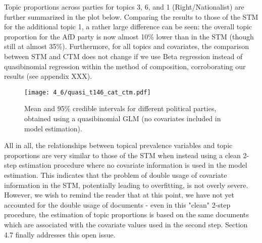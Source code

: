 \documentclass[12pt]{article}
\begin{document}
Topic proportions across parties for topics 3, 6, and 1 (Right/Nationalist) are further summarized in the plot below. Comparing the results to those of the STM for the additional topic 1, a rather large difference can be seen: the overall topic proportion for the AfD party is now almost 10\% lower than in the STM (though still at almost 35\%). Furthermore, for all topics and covariates, the comparison between STM and CTM does not change if we use Beta regression instead of quasibinomial regression within the method of composition, corroborating our results (see appendix XXX).

\begin{figure}[h!]
  \centering
  \captionsetup{justification=centering,margin=2cm}
  \texttt{[image: 4\_6/quasi\_t146\_cat\_ctm.pdf]}
  \caption{Mean and 95\% credible intervals for different political parties,
obtained using a quasibinomial GLM (no covariates included in model estimation).}
  \label{fig:quasi_t146_cat_ctm}
\end{figure}

All in all, the relationships between topical prevalence variables and topic proportions are very similar to those of the STM when instead using a clean 2-step estimation procedure where no covariate information is used in the model estimation. This indicates that the problem of double usage of covariate information in the STM, potentially leading to overfitting, is not overly severe. However, we wish to remind the reader that at this point, we have not yet accounted for the double usage of documents - even in this "clean" 2-step procedure, the estimation of topic proportions is based on the same documents which are associated with the covariate values used in the second step. Section 4.7 finally addresses this open issue.




\end{document}
